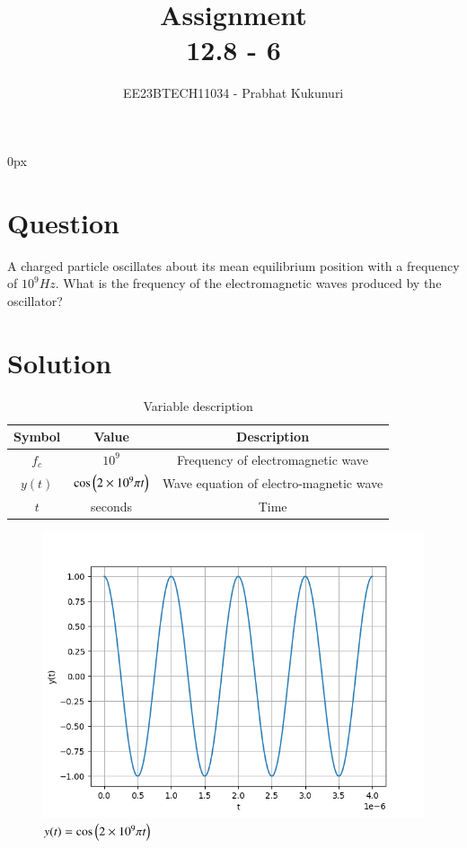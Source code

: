 \documentclass[journal,12pt,twocolumn]{IEEEtran}
\theoremstyle{remark}
\begin{document}
\parindent 0px


\title{Assignment\\[1ex]12.8 - 6}
\author{EE23BTECH11034 - Prabhat Kukunuri$^{}$%
}
\maketitle
\newpage
\bigskip

\renewcommand{\thefigure}{\theenumi}
\renewcommand{\thetable}{\theenumi}
\section*{Question}
A charged particle oscillates about its mean equilibrium position with a frequency of $10^9Hz$. What is the frequency of the electromagnetic waves produced by the oscillator?

\section*{Solution}

\begin{table}[h]
    \centering
    \begin{tabular}{|c|c|c|}
    \hline
   Symbol&Value&Description\\ \hline
   $f_c$&$10^9$&Frequency of electromagnetic wave\\ \hline
   $y(t)$&$\cos\left(2\times10^9{\pi}t\right)$&Wave equation of electro-magnetic wave\\ \hline
   $t$&seconds&Time\\ \hline

    \end{tabular}
    \caption{Variable description}
    \label{tab:12.8.6.1}
\end{table}

\begin{figure}[h]
    \centering
    \includegraphics[width=\columnwidth]{Figure_1.png}
    \caption{$y(t)=\cos\left(2\times10^9{\pi}t\right)$}
    \label{fig:12.8.6.2}
\end{figure}
\end{document}
